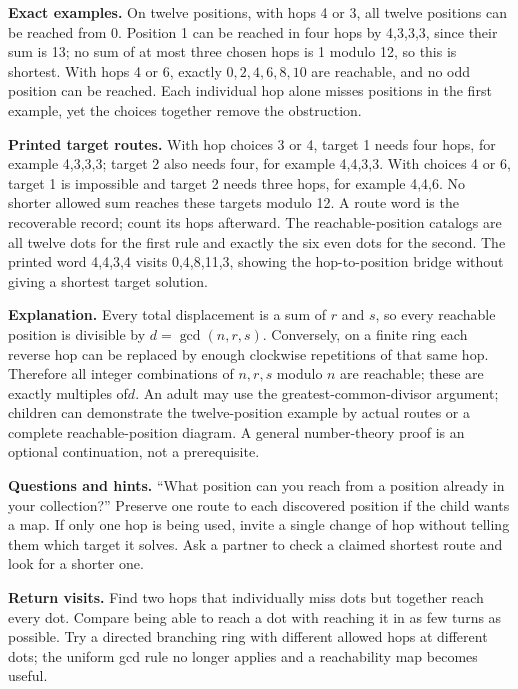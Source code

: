 \documentclass[11pt]{article}
\begin{document}
\textbf{Exact examples.} On twelve positions, with hops 4 or 3, all twelve positions can be reached from 0. Position 1 can be reached in four hops by 4,3,3,3, since their sum is 13; no sum of at most three chosen hops is 1 modulo 12, so this is shortest. With hops 4 or 6, exactly $0,2,4,6,8,10$ are reachable, and no odd position can be reached. Each individual hop alone misses positions in the first example, yet the choices together remove the obstruction.

\textbf{Printed target routes.} With hop choices 3 or 4, target 1 needs four hops, for example 4,3,3,3; target 2 also needs four, for example 4,4,3,3. With choices 4 or 6, target 1 is impossible and target 2 needs three hops, for example 4,4,6. No shorter allowed sum reaches these targets modulo 12. A route word is the recoverable record; count its hops afterward. The reachable-position catalogs are all twelve dots for the first rule and exactly the six even dots for the second. The printed word 4,4,3,4 visits 0,4,8,11,3, showing the hop-to-position bridge without giving a shortest target solution.

\textbf{Explanation.} Every total displacement is a sum of $r$ and $s$, so every reachable position is divisible by $d=\gcd(n,r,s)$. Conversely, on a finite ring each reverse hop can be replaced by enough clockwise repetitions of that same hop. Therefore all integer combinations of $n,r,s$ modulo $n$ are reachable; these are exactly multiples of$d$. An adult may use the greatest-common-divisor argument; children can demonstrate the twelve-position example by actual routes or a complete reachable-position diagram. A general number-theory proof is an optional continuation, not a prerequisite.

\textbf{Questions and hints.} ``What position can you reach from a position already in your collection?'' Preserve one route to each discovered position if the child wants a map. If only one hop is being used, invite a single change of hop without telling them which target it solves. Ask a partner to check a claimed shortest route and look for a shorter one.

\textbf{Return visits.} Find two hops that individually miss dots but together reach every dot. Compare being able to reach a dot with reaching it in as few turns as possible. Try a directed branching ring with different allowed hops at different dots; the uniform gcd rule no longer applies and a reachability map becomes useful.
\end{document}

